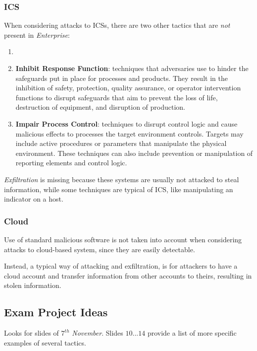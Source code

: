 \subsubsection{ICS}
When considering attacks to ICSs,
there are two other tactics that are \textit{not} present in \textit{Enterprise}:
\begin{enumerate}
   \item 
   \item \textbf{Inhibit Response Function}:
   techniques that adversaries use to hinder the
   safeguards put in place for processes and products.
   They result in the inhibition of
   safety, protection, quality assurance, or operator intervention functions to
   disrupt safeguards that aim to prevent the loss of life, destruction of
   equipment, and disruption of production.
   \item \textbf{Impair Process Control}:
   techniques to disrupt control logic and cause
   malicious effects to processes the target environment controls. 
   Targets may include active procedures or parameters that manipulate the
   physical environment. These techniques can also include prevention or
   manipulation of reporting elements and control logic.
\end{enumerate}

\textit{Exfiltration} is missing because these systems are usually not attacked to steal information,
while some techniques are typical of ICS,
like manipulating an indicator on a host.

\subsubsection{Cloud}
Use of standard malicious software is not taken into account when considering attacks to cloud-based system,
since they are easily detectable.

Instead, a typical way of attacking and exfiltration,
is for attackers to have a cloud account and transfer information from other accounts to theirs,
resulting in stolen information.

\subsection{Exam Project Ideas}
Looks for slides of $7^{th}$ \textit{November}.
Slides $10...14$ provide a list of more specific examples of several tactics.